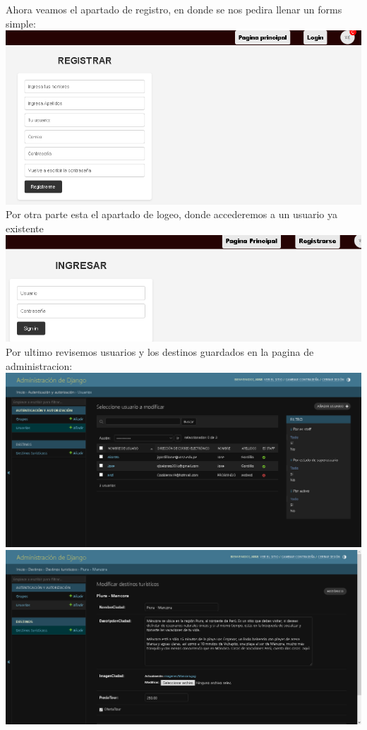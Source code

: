 \documentclass{article}
\begin{document}
        Ahora veamos el apartado de registro, en donde se nos pedira llenar un forms simple:\newline
        \includegraphics[width=16cm]{img/REGISTRO.png}
        \newline
        Por otra parte esta el apartado de logeo, donde accederemos a un usuario ya existente\newline
        \includegraphics[width=16cm]{img/LOGIN.png}
        \newline
        Por ultimo revisemos usuarios y los destinos guardados en la pagina de administracion:\newline
         \includegraphics[width=16cm]{img/usuarios.png}
          \includegraphics[width=16cm]{img/EJEMPLOdestino.png}
\end{document}

